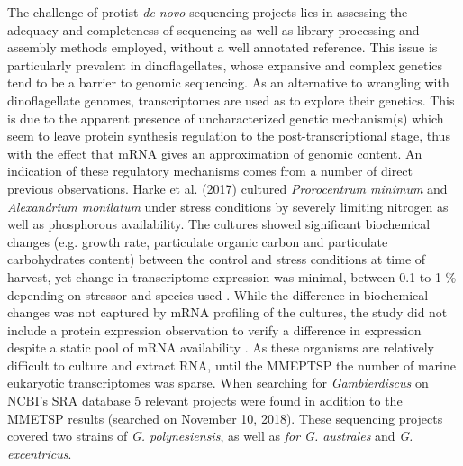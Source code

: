 \documentclass[12pt]{article}
\begin{document}

The challenge of protist \textit{de novo} sequencing projects lies in assessing the adequacy and completeness of sequencing as well as library processing and assembly methods employed,  without a well annotated reference. 
This issue is particularly prevalent in dinoflagellates, whose expansive and complex genetics tend to be a barrier to genomic sequencing. 
As an alternative to wrangling with dinoflagellate genomes, transcriptomes are used as to explore their genetics. %
This is due to the apparent presence of uncharacterized genetic mechanism(s) which seem to leave protein synthesis regulation to the post-transcriptional stage, thus with the effect that mRNA gives an approximation of genomic content. 
An indication of these regulatory mechanisms comes from a number of direct previous observations. 
Harke et al. (2017) cultured \textit{Prorocentrum minimum} and \textit{Alexandrium monilatum} under stress conditions by severely limiting nitrogen as well as phosphorous availability. 
The cultures showed significant biochemical changes (e.g. growth rate, particulate organic carbon and particulate carbohydrates content) between the control and stress conditions at time of harvest, yet change in transcriptome expression was minimal, between 0.1 to 1 \% depending on stressor and species used \cite{harke2017conserved}. 
While the difference in biochemical changes was not captured by mRNA profiling of the cultures, the study did not include a protein expression observation to verify a difference in expression despite a static pool of mRNA availability \cite{harke2017conserved}.
As these organisms are relatively difficult to culture and extract RNA, until the MMEPTSP the number of marine eukaryotic transcriptomes was sparse. 
When searching for \textit{Gambierdiscus} on NCBI's SRA database 5 relevant projects were found in addition to the MMETSP results (searched on November 10, 2018). 
These sequencing projects covered two strains of \textit{G. polynesiensis}, as well as \textit{for G. australes} and \textit{G. excentricus}. 
\end{document}
